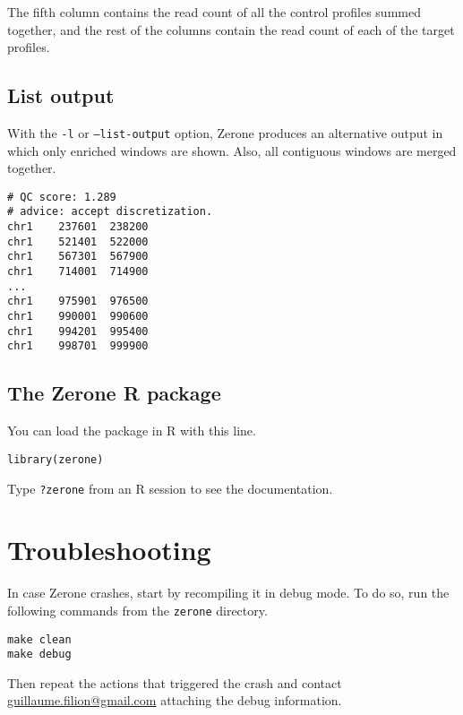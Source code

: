 \documentclass[12pt]{article}
\begin{document}
The fifth column contains the read count of all the control profiles summed
together, and the rest of the columns contain the read count of each of the
target profiles.

\subsection{List output}

With the \texttt{-l} or \texttt{--list-output} option, Zerone produces an
alternative output in which only enriched windows are shown. Also, all
contiguous windows are merged together.

\begin{verbatim}
# QC score: 1.289
# advice: accept discretization.
chr1    237601  238200
chr1    521401  522000
chr1    567301  567900
chr1    714001  714900
...
chr1    975901  976500
chr1    990001  990600
chr1    994201  995400
chr1    998701  999900
\end{verbatim}

\pagebreak

\subsection*{The Zerone R package}

You can load the package in R with this line.

\begin{verbatim}
library(zerone)
\end{verbatim}

Type \texttt{?zerone} from an R session to see the documentation.

\section{Troubleshooting}

In case Zerone crashes, start by recompiling it in debug mode. To do so,
run the following commands from the \texttt{zerone} directory.

\begin{verbatim}
make clean
make debug
\end{verbatim}

Then repeat the actions that triggered the crash and contact
\href{mailto:guillaume.filion@gmail.com}{guillaume.filion@gmail.com}
attaching the debug information.
\end{document}
